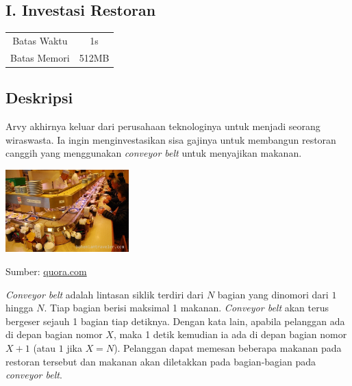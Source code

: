 \documentclass{article}
\begin{document}
\begin{center}
    \section*{I. Investasi Restoran}

    \begin{tabular}{ | c c | }
        \hline
        Batas Waktu  & 1s \\
        Batas Memori & 512MB \\
        \hline
    \end{tabular}
\end{center}

\subsection*{Deskripsi}

Arvy akhirnya keluar dari perusahaan teknologinya untuk menjadi seorang wiraswasta.
Ia ingin menginvestasikan sisa gajinya untuk membangun restoran canggih yang menggunakan \textit{conveyor belt} untuk menyajikan makanan.

\begin{center}
    \includegraphics[width=180px]{conveyor-belt}

    \footnotesize Sumber: \href{https://www.quora.com/How-much-food-should-I-take-at-a-conveyor-belt-sushi-restaurant-I-am-an-exchange-student-in-Japan-and-my-host-family-is-taking-me-to-a-restaurant-where-you-take-all-you-can-eat-How-much-should-I-take-The-family-seems-fairly-well-off}{quora.com}
\end{center}

\textit{Conveyor belt} adalah lintasan siklik terdiri dari $N$ bagian yang dinomori dari $1$ hingga $N$.
Tiap bagian berisi maksimal 1 makanan.
\textit{Conveyor belt} akan terus bergeser sejauh 1 bagian tiap detiknya.
Dengan kata lain, apabila pelanggan ada di depan bagian nomor $X$, maka 1 detik kemudian ia ada di depan bagian nomor $X + 1$ (atau $1$ jika $X = N$).
Pelanggan dapat memesan beberapa makanan pada restoran tersebut dan makanan akan diletakkan pada bagian-bagian pada \textit{conveyor belt}.
\end{document}
